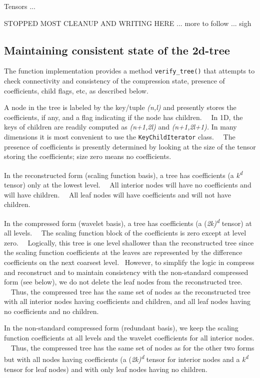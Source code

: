 \documentclass[letterpaper]{book}
\begin{document}
Tensors ...

STOPPED MOST CLEANUP AND WRITING HERE ... more to follow ... sigh

\subsection{Maintaining consistent state of the 2d-tree}
The function implementation provides a method \texttt{verify\_tree()} that attempts to check connectivity and
consistency of the compression state, presence of coefficients, child flags, etc, as described below.

A node in the tree is labeled by the key/tuple \textit{(n,l)} and presently stores the coefficients, if any, and a flag
indicating if the node has children. \ \ In 1D, the keys of children are readily computed as \textit{(n+1,2l)} and
\textit{(n+1,2l+1). }In many dimensions it is most convenient to use the \texttt{KeyChildIterator} class. \ \ The
presence of coefficients is presently determined by looking at the size of the tensor storing the coefficients; size
zero means no coefficients.

In the reconstructed form (scaling function basis), a tree has coefficients (a \textit{k}\textit{\textsuperscript{d}}
tensor) only at the lowest level. \ \ All interior nodes will have no coefficients and will have children. \ \ All leaf
nodes will have coefficients and will not have children.

In the compressed form (wavelet basis), a tree has coefficients (a (\textit{2k)}\textit{\textsuperscript{d}} tensor) at
all levels. \ \ The scaling function block of the coefficients is zero except at level zero. \ \ Logically, this tree
is one level shallower than the reconstructed tree since the scaling function coefficients at the leaves are
represented by the difference coefficients on the next coarsest level. \ However, to simplify the logic in compress and
reconstruct and to maintain consistency with the non-standard compressed form (see below), we do not delete the leaf
nodes from the reconstructed tree. \ \ Thus, the compressed tree has the same set of nodes as the reconstructed tree
with all interior nodes having coefficients and children, and all leaf nodes having no coefficients and no children. \ 

In the non-standard compressed form (redundant basis), we keep the scaling function coefficients at all levels and the
wavelet coefficients for all interior nodes. \ \ Thus, the compressed tree has the same set of nodes as for the other
two forms but with all nodes having coefficients (a (\textit{2k)}\textit{\textsuperscript{d}} tensor for interior nodes
and a \textit{k}\textit{\textsuperscript{d}} tensor for leaf nodes) and with only leaf nodes having no children.
\end{document}
